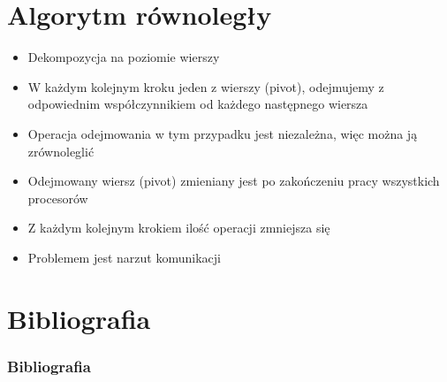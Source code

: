 \documentclass{beamer}
\begin{document}
	\section{Algorytm równoległy}
	\begin{frame}
		\begin{itemize}
			\item Dekompozycja na poziomie wierszy
			\item W każdym kolejnym kroku jeden z wierszy (pivot), odejmujemy z odpowiednim współczynnikiem od każdego następnego wiersza
			\item Operacja odejmowania w tym przypadku jest niezależna, więc można ją zrównoleglić
			\item Odejmowany wiersz (pivot) zmieniany jest po zakończeniu pracy wszystkich procesorów
			\item Z każdym kolejnym krokiem ilość operacji zmniejsza się
			\item Problemem jest narzut komunikacji
		\end{itemize}
	\end{frame}

	\section{Bibliografia}
		\begin{frame}
		\frametitle{Bibliografia}
			\begin{thebibliography}{1}
			\end{thebibliography}
		\end{frame}
		
\end{document}
